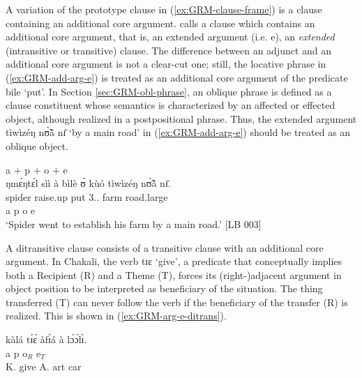 \z 
 \z



A variation of the prototype  clause in (\ref{ex:GRM-clause-frame}) is a
clause containing an additional core argument.  \citet[116]{Dixo10b} calls  a
clause which contains an
additional core argument, that is,  an extended argument (i.e. {\sc e}), an
{\it extended} (intransitive or transitive) clause. The
difference between an adjunct and an additional core argument is not a clear-cut
one;   still,   the locative phrase in (\ref{ex:GRM-add-arg-e}) is treated as
  an additional core argument of the predicate {\sls bile} `put'. In Section
\ref{sec:GRM-obl-phrase}, an oblique phrase is defined as a clause constituent whose semantics is
characterized by an  affected or effected object, although realized in a
postpositional phrase. Thus, the extended argument {\sls  tìwìzéŋ nʊ̃̀ã̀  nɪ̄}   `by a main road' in (\ref{ex:GRM-add-arg-e}) should be treated as an oblique object. 

\newpage 

\ea\label{ex:GRM-add-arg-e}{{\sc a} $+$ {\sc p}  $+$  {\sc o} $+$   {\sc e}}\\
\glll ŋmɛ́ŋtɛ́l sìì à bìlè  ʊ̀  kùó  tìwìzéŋ nʊ̃̀ã̀  nɪ̄.\\
spider raise.up   {\conn} put {3.\sg.\poss}   farm road.large  {\reln}  {\postp}\\
{\sc a}  {\sc p} {} {}    {\sc o} {}    {\sc e} {}  {} \\

\glt  `Spider went to establish his farm by a main road.' [LB 003]

\z

A ditransitive clause consists of a transitive clause with an additional core argument.  In Chakali, the verb {\sls tɪɛ} `give', a predicate that conceptually implies both a Recipient (R)  and a Theme (T), forces its (right-)adjacent argument in object position to be interpreted as  beneficiary of the situation. The thing transferred (T) can never follow the verb if the beneficiary of the transfer (R) is realized. This is shown in (\ref{ex:GRM-arg-e-ditrans}).

\ea\label{ex:GRM-arg-e-ditrans}

 \ea\label{ex:GRM-arg-e-ditrans-ben-the-1}
\glll kàlá tɪ́ɛ́ àfɪ́á {à lɔ́ɔ́lɪ̀}.\\
{\sc a} {\sc p} {\sc o}$_{R}$ {\sc e}$_{T}$\\
K. give A.  {{\sc art} car}\\

